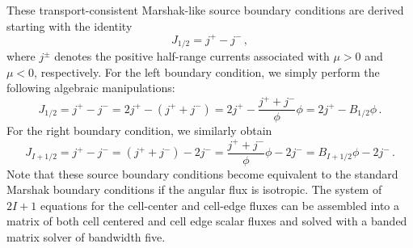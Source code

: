 These transport-consistent Marshak-like source boundary conditions are derived starting with the identity
\begin{equation}
J_{1/2}=j^+ - j^- \,,
\end{equation}
where $j^\pm$ denotes the positive half-range currents associated with $\mu >0$ and $\mu <0$, respectively.  For the left boundary condition, we simply perform the following algebraic manipulations:
\begin{equation}
J_{1/2} = j^+ - j^-  = 2j^+ - (j^+ + j^-) = 2j^+ - \frac{j^+ + j^-}{\phi} \phi = 2j^+ - B_{1/2} \phi  \, .
\end{equation}
For the right boundary condition, we similarly obtain
\begin{equation}
J_{I+1/2} = j^+ - j^-  = (j^+ + j^-) - 2j^- = \frac{j^+ + j^-}{\phi} \phi - 2j^- = B_{I+1/2} \phi - 2j^-\, .
\end{equation}
Note that these source boundary conditions become equivalent to the standard Marshak boundary conditions if the \SN angular flux 
is isotropic. 
The system of $2I+1$ equations for the cell-center and cell-edge fluxes can be assembled into a matrix of both cell centered and cell edge scalar fluxes and solved with a banded matrix solver of bandwidth five. 

	
	

